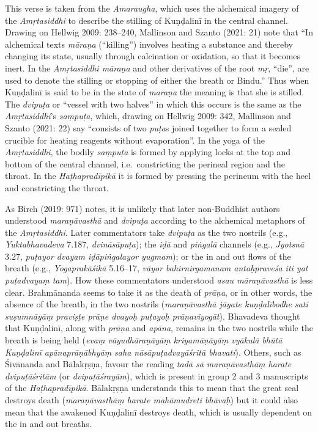 \begin{ekdosis}
\begin{philcomm}[hp03_012]
This verse is taken from the \emph{Amaraugha}, which uses the alchemical imagery of the \emph{Amṛtasiddhi} to describe the stilling of Kuṇḍalinī in the central channel. Drawing on Hellwig 2009: 238–240, Mallinson and Szanto (2021: 21) note that “In alchemical texts \emph{māraṇa} (“killing”) involves heating a substance and thereby changing its state, usually through calcination or oxidation, so that it becomes inert. In the \emph{Amṛtasiddhi māraṇa} and other derivatives of the root \emph{mṛ}, “die”, are used to denote the stilling or stopping of either the breath or Bindu.” Thus when Kuṇḍalinī is said to be in the state of \emph{maraṇa} the meaning is that she is stilled. The \emph{dvipuṭa} or “vessel with two halves” in which this occurs is the same as the \emph{Amṛtasiddhi}’s \emph{saṃpuṭa}, which, drawing on Hellwig 2009: 342, Mallinson and Szanto (2021: 22) say “consists of two \emph{puṭa}s joined together to form a sealed crucible for heating reagents without evaporation”. In the yoga of the \emph{Amṛtasiddhi}, the bodily \emph{saṃpuṭa} is formed by applying locks at the top and bottom of the central channel, i.e.~constricting the perineal region and the throat. In the \emph{Haṭhapradīpikā} it is formed by pressing the perineum with the heel and constricting the throat.\lb

As Birch (2019: 971) notes, it is unlikely that later non-Buddhist authors understood \textit{maraṇāvasthā} and \emph{dvipuṭa} according to the alchemical metaphors of the \textit{Amṛtasiddhi}. Later commentators take \emph{dvipuṭa} as the two nostrils (e.g., \textit{Yuktabhavadeva} 7.187, \textit{dvināsāpuṭa}); the \textit{iḍā} and \textit{piṅgalā} channels (e.g., \textit{Jyotsnā} 3.27, \textit{puṭayor dvayam iḍāpiṅgalayor yugmam}); or the in and out flows of the breath (e.g., \textit{Yogaprakāśikā} 5.16–17, \textit{vāyor bahirnirgamanam antaḥpraveśa iti yat puṭadvayaṃ tam}). How these commentators understood \textit{asau māraṇāvasthā} is less clear. Brahmānanda seems to take it as the death of \textit{prāṇa}, or in other words, the absence of the breath, in the two nostrils (\textit{maraṇāvasthā jāyate kuṇḍalībodhe sati suṣumnāyāṃ praviṣṭe prāṇe dvayoḥ puṭayoḥ prāṇaviyogāt}).  Bhavadeva thought that Kuṇḍalinī, along with \textit{prāṇa} and \textit{apāna}, remains in the two nostrils while the breath is being held (\textit{evaṃ vāyudhāraṇāyāṃ kriyamāṇāyāṃ vyākulā bhūtā Kuṇḍalinī apānaprāṇābhyāṃ saha nāsāpuṭadvayāśritā bhavati}). Others, such as Śivānanda and Bālakṛṣṇa, favour the reading \textit{tadā sā maraṇāvasthāṃ harate dvi\-puṭāśritām} (or \textit{dvipuṭāśrayām}), which is present in group 2 and 3 manuscripts of the \textit{Haṭhapradīpikā}. Bālakṛṣṇa understands this to mean that the great seal destroys death (\textit{maraṇāvasthāṃ harate mahāmudreti bhāvaḥ}) but it could also mean that the awakened Kuṇḍalinī destroys death, which is usually dependent on the in and out breaths.\lb


\end{philcomm}
\end{ekdosis}
